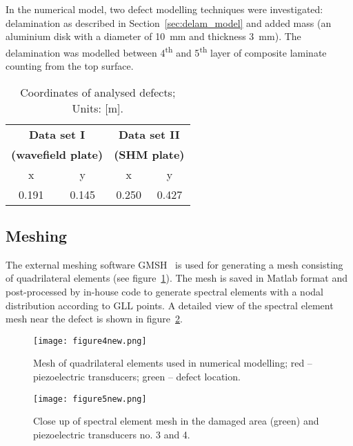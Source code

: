 \documentclass[12pt]{iopart}
\begin{document}
In the numerical model, two defect modelling techniques were investigated: delamination as described in Section~\ref{sec:delam_model} and added mass (an aluminium disk with a diameter of 10~mm and thickness 3~mm). The delamination was modelled between 4\textsuperscript{th} and 5\textsuperscript{th} layer of composite laminate counting from the top surface.
\begin{table}
	\caption{Coordinates of analysed defects; Units: [m].}
	\begin{indented}
	\item[]\begin{tabular}{cccc} 
		\toprule
		\multicolumn{2}{c}{\textbf{Data set I} }	& \multicolumn{2}{c}{\textbf{Data set II} } \\
		\multicolumn{2}{c}{\textbf{(wavefield plate)} }	& \multicolumn{2}{c}{\textbf{(SHM plate)} } \\
		\cmidrule(lr){1-2} \cmidrule(lr){3-4}
		x & y &  x &  y  \\
		0.191 & 0.145 & 0.250  & 0.427 \\ 
		\bottomrule 
	\end{tabular} 
	\end{indented}
	\label{tab:defect_coordinates}
\end{table}	
	
\subsection{Meshing}
The external meshing software GMSH~\cite{Geuzaine2009} is used for generating a mesh consisting of quadrilateral elements (see figure~\ref{fig:quad_mesh}). The mesh is saved in Matlab format and post-processed by in-house code to generate spectral elements with a nodal distribution according to GLL points. A detailed view of the spectral element mesh near the defect is shown in figure~\ref{fig:spec_mesh_zoom}. 
\begin{figure} [h!]
	\centering
	\texttt{[image: figure4new.png]}	
	\caption{Mesh of quadrilateral elements used in numerical modelling; red -- piezoelectric transducers; green -- defect location.}
	\label{fig:quad_mesh}
\end{figure}
\begin{figure} [h!]
	\centering
	\texttt{[image: figure5new.png]}	
	\caption{Close up of spectral element mesh in the damaged area (green) and piezoelectric transducers no. 3 and 4.}
	\label{fig:spec_mesh_zoom}
\end{figure}
\clearpage
\end{document}
